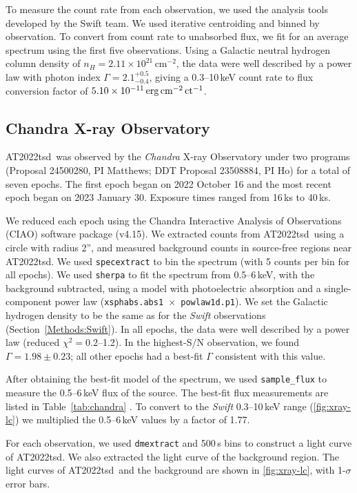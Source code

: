 \documentclass{nature_plusfigure}
\newcommand{\at}{AT2022tsd}
\begin{document}
\begin{methods}
To measure the count rate from each observation, we used the analysis tools developed by the Swift team\cite{Evans2007,Evans2009}.
We used iterative centroiding and binned by observation. 
To convert from count rate to unabsorbed flux, we fit for an average spectrum using the first five observations. Using a Galactic neutral hydrogen column density\cite{Willingale2013} of $n_H=2.11\times10^{21}\,$cm$^{-2}$, the data were well described by a power law with photon index $\Gamma=2.1^{+0.5}_{-0.4}$, 
giving a 0.3--10\,keV count rate to flux conversion factor of $5.10\times 10^{-11}\,\rm erg\,cm^{-2}\,ct^{-1}$.

\subsection{Chandra X-ray Observatory}
\label{sec:chandra}

\at\ was observed by the \emph{Chandra} X-ray Observatory under two programs (Proposal 24500280, PI Matthews; DDT Proposal 23508884, PI Ho) for a total of seven epochs. The first epoch began on 2022 October 16 and the most recent epoch began on 2023 January 30. Exposure times ranged from 16\,ks to 40\,ks.

We reduced each epoch using the Chandra Interactive Analysis of Observations (CIAO\cite{Fruscione2006}) software package (v4.15). We extracted counts from \at\ using a circle with radius 2'', and measured background counts in source-free regions near \at.
We used \texttt{specextract} to bin the spectrum (with 5 counts per bin for all epochs). We used \texttt{sherpa} to fit the spectrum from 0.5--6\,keV, with the background subtracted, using a model with photoelectric absorption and a single-component power law (\texttt{xsphabs.abs1 $\times$ powlaw1d.p1}). We set the Galactic hydrogen density to be the same as for the \emph{Swift} observations (Section~\ref{Methods:Swift}). In all epochs, the data were well described by a power law (reduced $\chi^2=0.2$--1.2). In the highest-S/N observation, we found $\Gamma=1.98\pm0.23$; all other epochs had a best-fit $\Gamma$ consistent with this value.

After obtaining the best-fit model of the spectrum, we used \texttt{sample\_flux} to measure the 0.5--6\,keV flux of the source. The best-fit flux measurements are listed in Table~\ref{tab:chandra} . To convert to the \emph{Swift} 0.3--10\,keV range (\ref{fig:xray-lc}) we multiplied the 0.5--6\,keV values by a factor of 1.77.

For each observation, we used \texttt{dmextract} and 500\,s bins to construct a light curve of \at. We also extracted the light curve of the background region. The light curves of \at\ and the background are shown in \ref{fig:xray-lc}, with 1-$\sigma$ error bars.


\end{methods}
\end{document}
